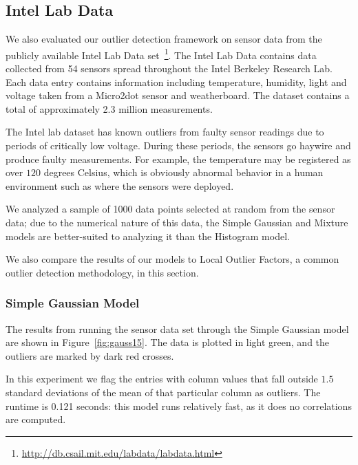 \subsection{Intel Lab Data}
\label{sec:intel-lab-data-evaluation}

We also evaluated our outlier detection framework on sensor data from the publicly available Intel Lab Data set~\footnote{\url{http://db.csail.mit.edu/labdata/labdata.html}}. The Intel Lab Data contains data collected from 54 sensors spread throughout the Intel Berkeley Research Lab. Each data entry contains information including temperature, humidity, light and voltage taken from a Micro2dot sensor and weatherboard. The dataset contains a total of approximately 2.3 million measurements.

The Intel lab dataset has known outliers from faulty sensor readings due to periods of critically low voltage. During these periods, the sensors go haywire and produce faulty measurements. For example, the temperature may be registered as over $120$ degrees Celsius, which is obviously abnormal behavior in a human environment such as where the sensors were deployed.
 
We analyzed a sample of 1000 data points selected at random from the sensor data; due to the numerical nature of this data, the Simple Gaussian and Mixture models are better-suited to analyzing it than the Histogram model.

We also compare the results of our models to Local Outlier Factors, a common outlier detection methodology, in this section.
 
\subsubsection{Simple Gaussian Model}

The results from running the sensor data set through the Simple Gaussian model are shown in Figure~\ref{fig:gauss15}. The data is plotted in light green, and the outliers are marked by dark red crosses. 

In this experiment we flag the entries with column values that fall outside $1.5$ standard deviations of the mean of that particular column as outliers. The runtime is 0.121 seconds: this model runs relatively fast, as it does no correlations are computed.


